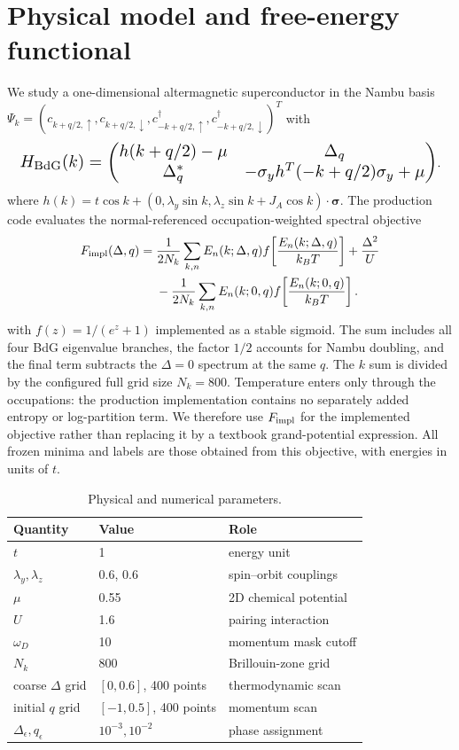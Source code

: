 \section{Physical model and free-energy functional}
We study a one-dimensional altermagnetic superconductor in the Nambu basis
$\Psi_k=(c_{k+q/2,\uparrow},c_{k+q/2,\downarrow},c^\dagger_{-k+q/2,\uparrow},c^\dagger_{-k+q/2,\downarrow})^T$ with
\begin{equation}
\resizebox{0.98\columnwidth}{!}{$H_{\rm BdG}(k)=\begin{pmatrix}h(k+q/2)-\mu&\Delta_q\\ \Delta_q^*&-\sigma_y h^T(-k+q/2)\sigma_y+\mu\end{pmatrix}$}.
\end{equation}
where $h(k)=t\cos k+(0,\lambda_y\sin k,\lambda_z\sin k+J_A\cos k)\cdot\boldsymbol\sigma$.
The production code evaluates the normal-referenced occupation-weighted spectral objective
\begin{align}
F_{\rm impl}(\Delta,q)={}&\frac{1}{2N_k}\sum_{k,n}E_n(k;\Delta,q)
f\!\left[\frac{E_n(k;\Delta,q)}{k_BT}\right]+\frac{\Delta^2}{U}\notag\\
&-\frac{1}{2N_k}\sum_{k,n}E_n(k;0,q)
f\!\left[\frac{E_n(k;0,q)}{k_BT}\right].
\end{align}
with $f(z)=1/(e^z+1)$ implemented as a stable sigmoid.  The sum includes all four BdG eigenvalue branches, the factor $1/2$ accounts for Nambu doubling, and the final term subtracts the $\Delta=0$ spectrum at the same $q$.  The $k$ sum is divided by the configured full grid size $N_k=800$.  Temperature enters only through the occupations: the production implementation contains no separately added entropy or log-partition term.  We therefore use $F_{\rm impl}$ for the implemented objective rather than replacing it by a textbook grand-potential expression.  All frozen minima and labels are those obtained from this objective, with energies in units of $t$.

\begin{table}[h]\caption{Physical and numerical parameters.}\label{tab:s1}\centering\small
\begin{tabular}{lll}\toprule Quantity & Value & Role\\\midrule
$t$ & 1 & energy unit\\ $\lambda_y,\lambda_z$ & 0.6, 0.6 & spin--orbit couplings\\ $\mu$ & 0.55 & 2D chemical potential\\ $U$ & 1.6 & pairing interaction\\ $\omega_D$ & 10 & momentum mask cutoff\\ $N_k$ & 800 & Brillouin-zone grid\\ coarse $\Delta$ grid & $[0,0.6]$, 400 points & thermodynamic scan\\ initial $q$ grid & $[-1,0.5]$, 400 points & momentum scan\\ $\Delta_\epsilon,q_\epsilon$ & $10^{-3},10^{-2}$ & phase assignment\\\bottomrule\end{tabular}\end{table}

